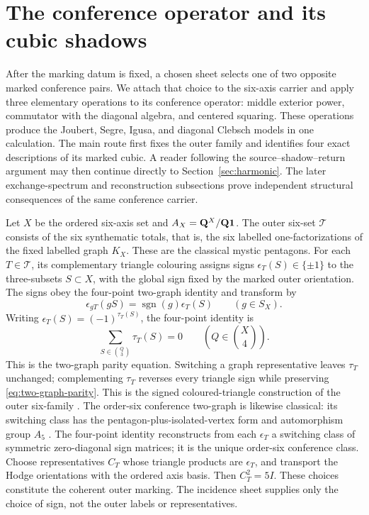 \section{The conference operator and its cubic shadows}
\label{sec:conference-operator}

After the marking datum is fixed, a chosen sheet selects one of two opposite
marked conference pairs.  We attach that choice to the six-axis
carrier and apply
three elementary operations to its
conference operator: middle exterior power, commutator with the diagonal
algebra, and centered squaring.  These operations produce the Joubert,
Segre, Igusa, and diagonal Clebsch models in one calculation.
The main route first fixes the outer family and identifies four exact
descriptions of its marked cubic.  A reader following the
source--shadow--return argument may then continue directly to
Section~\ref{sec:harmonic}.  The later exchange-spectrum and reconstruction
subsections prove independent structural consequences of the same conference
carrier.

Let \(X\) be the ordered six-axis set and
\(A_X=\mathbf Q^X/\mathbf Q\mathbf1\).  The outer six-set \(\mathcal T\) consists of the
six synthematic totals, that is, the six labelled one-factorizations of the
fixed labelled graph \(K_X\).
These are the classical mystic pentagons.  For each \(T\in\mathcal T\), its
complementary triangle colouring assigns signs
\(\epsilon_T(S)\in\{\pm1\}\) to the three-subsets \(S\subset X\), with the
global sign fixed by the marked outer orientation.  The signs obey the
four-point two-graph identity and transform by
\[
 \epsilon_{gT}(gS)=\operatorname{sgn}(g)\epsilon_T(S)
 \qquad(g\in S_X).
\]
Writing \(\epsilon_T(S)=(-1)^{\tau_T(S)}\), the four-point identity is
\begin{equation}
 \label{eq:two-graph-parity}
 \sum_{S\in\binom Q3}\tau_T(S)=0
 \qquad\left(Q\in\binom X4\right).
\end{equation}
This is the two-graph parity equation.  Switching a graph representative
leaves \(\tau_T\) unchanged; complementing \(\tau_T\) reverses every triangle
sign while preserving \eqref{eq:two-graph-parity}.
This is the signed coloured-triangle construction of the outer six-family
\cite[Sections~1.1--1.2 and~1.6]{HMSVOuter}.
The order-six conference two-graph is likewise classical: its switching
class has the pentagon-plus-isolated-vertex form and automorphism group
\(A_5\) \cite{BMS}.
The four-point identity reconstructs from each \(\epsilon_T\) a switching
class of symmetric zero-diagonal sign matrices; it is the unique order-six
conference class.  Choose representatives \(C_T\) whose triangle products
are \(\epsilon_T\), and transport the Hodge orientations with the ordered
axis basis.  Then \(C_T^2=5I\).  These choices constitute the coherent outer
marking.  The incidence sheet supplies only the choice of sign, not the
outer labels or representatives.

